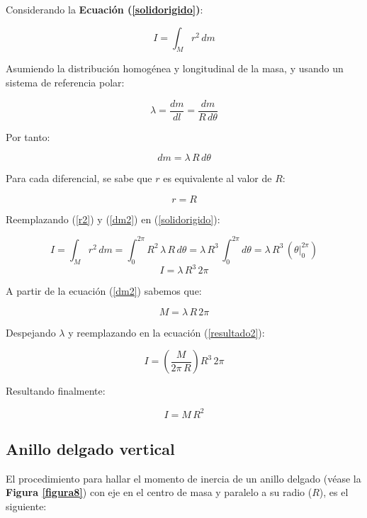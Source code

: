\documentclass[letter,oneside,11pt]{article}
\begin{document}
Considerando la \textbf{Ecuación (\ref{solidorigido})}:

\begin{equation*}
    I = \int_{M} r^2\, dm
\tag{4}
\end{equation*}

Asumiendo la distribución homogénea y longitudinal de la masa, y usando un
sistema de referencia polar:

\begin{equation*}
    \lambda = \frac{dm}{dl} = \frac{dm}{R\, d\theta}
\end{equation*}

Por tanto:

\begin{equation}
    dm = \lambda\, R\, d\theta
\label{dm2}
\end{equation}

Para cada diferencial, se sabe que $r$ es equivalente al valor de
$R$:

\begin{equation}
    r = R
\label{r2}
\end{equation}

Reemplazando (\ref{r2}) y (\ref{dm2}) en (\ref{solidorigido}):

\begin{equation*}
    I = \int_{M} r^2\, dm = \int_{0}^{2\pi} R^2\, \lambda\, R\, d\theta = \lambda\, R^3\, \int_{0}^{2\pi} d\theta = \lambda\, R^3\, (\theta \Biggr|_{0}^{2\pi})
\end{equation*}
\begin{equation}
    I = \lambda\, R^3\, 2\pi
\label{resultado2}
\end{equation}

A partir de la ecuación (\ref{dm2}) sabemos que:

\begin{equation*}
    M = \lambda\, R\, 2\pi
\end{equation*}

Despejando $\lambda$ y reemplazando en la ecuación (\ref{resultado2}):

\begin{equation*}
    I = \left( \frac{M}{2\pi\, R} \right) R^3\, 2\pi
\end{equation*}

Resultando finalmente:

\begin{equation}
    I = M\, R^2
\end{equation}

\subsection{Anillo delgado vertical}
El procedimiento para hallar el momento de inercia de un anillo delgado (véase
la \textbf{Figura \ref{figura8}}) con eje en el centro de masa y paralelo a
su radio ($R$), es el siguiente:
\end{document}

